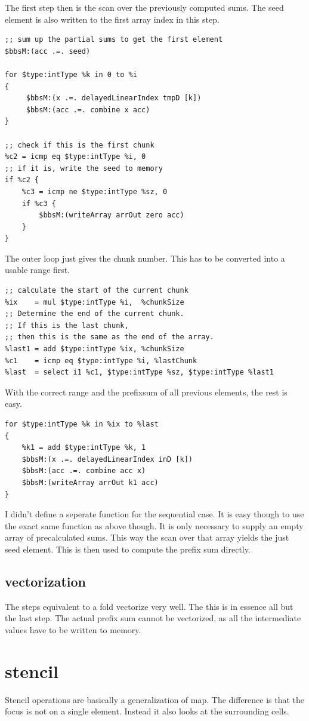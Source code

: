 \documentclass[a4paper,bibliography=totocnumbered,parskip,headsepline]{scrbook}
\begin{document}
The first step then is the scan over the previously computed sums.
The seed element is also written to the first array index in this step.
\begin{lstlisting}
;; sum up the partial sums to get the first element
$bbsM:(acc .=. seed)

for $type:intType %k in 0 to %i
{
     $bbsM:(x .=. delayedLinearIndex tmpD [k])
     $bbsM:(acc .=. combine x acc)
}

;; check if this is the first chunk
%c2 = icmp eq $type:intType %i, 0
;; if it is, write the seed to memory
if %c2 {
    %c3 = icmp ne $type:intType %sz, 0
    if %c3 {
        $bbsM:(writeArray arrOut zero acc)
    }
}
\end{lstlisting}
The outer loop just gives the chunk number.
This has to be converted into a usable range first.
\begin{lstlisting}
;; calculate the start of the current chunk
%ix    = mul $type:intType %i,  %chunkSize
;; Determine the end of the current chunk.
;; If this is the last chunk,
;; then this is the same as the end of the array.
%last1 = add $type:intType %ix, %chunkSize
%c1    = icmp eq $type:intType %i, %lastChunk
%last  = select i1 %c1, $type:intType %sz, $type:intType %last1
\end{lstlisting}
With the correct range and the prefixsum of all previous elements, the rest is easy.
\begin{lstlisting}
for $type:intType %k in %ix to %last
{
    %k1 = add $type:intType %k, 1
    $bbsM:(x .=. delayedLinearIndex inD [k])
    $bbsM:(acc .=. combine acc x)
    $bbsM:(writeArray arrOut k1 acc)
}
\end{lstlisting}

I didn't define a seperate function for the sequential case.
It is easy though to use the exact same function as above though.
It is only necessary to supply an empty array of precalculated sums.
This way the scan over that array yields the just seed element.
This is then used to compute the prefix sum directly.

\subsection*{vectorization}
The steps equivalent to a fold vectorize very well.
The this is in essence all but the last step.
The actual prefix sum cannot be vectorized, as all the intermediate values have to be written to memory.

\section{stencil}
Stencil operations are basically a generalization of map.
The difference is that the focus is not on a single element.
Instead it also looks at the surrounding cells.
\end{document}
